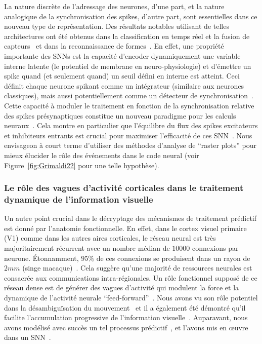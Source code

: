 La nature discrète de l'adressage des neurones, d'une part, et la nature
analogique de la synchronisation des spikes, d'autre part, sont
essentielles dans ce nouveau type de représentation. Des résultats
notables utilisant de telles architectures ont été obtenus dans la
classification en temps réel et la fusion de capteurs~\citep{Oconnor13} et dans la reconnaissance de formes~\citep{Lagorce17,Grimaldi21cbmi,Grimaldi22pami}. En
effet, une propriété importante des SNNs est la capacité d'encoder
dynamiquement une variable interne latente (le potentiel de membrane en
neuro-physiologie) et d'émettre un spike quand (et seulement quand) un
seuil défini en interne est atteint. Ceci définit chaque neurone spikant
comme un intégrateur (similaire aux neurones classiques), mais aussi
potentiellement comme un détecteur de synchronisation~\citep{Perrinet02}.
Cette capacité à moduler le traitement en fonction de la synchronisation
relative des spikes présynaptiques constitue un nouveau paradigme pour les
calculs neuraux~\citep{Paugam12}. Cela montre en
particulier que l'équilibre du flux des spikes excitateurs et inhibiteurs
entrants est crucial pour maximiser l'efficacité de ces SNN~\citep{Hansel12}. Nous envisageon à court terme d'utiliser des méthodes d'analyse de ``raster plots'' pour mieux élucider le rôle des événements dans le code neural (voir Figure~\ref{fig:Grimaldi22} pour une telle hypothèse).


\subsubsection{Le rôle des vagues d'activité corticales dans le traitement
dynamique de l'information
visuelle}
Un autre point crucial dans le décryptage des mécanismes de traitement
prédictif est donné par l'anatomie fonctionnelle. En effet, dans le
cortex visuel primaire (V1) comme dans les autres aires corticales, le
réseau neural est très majoritairement récurrent avec un nombre médian de $10000$
connexions par neurone. Étonnamment, $95 \%$ de ces connexions se
produisent dans un rayon de $2 mm$ (singe macaque)~\citep{Markov13}.
Cela suggère qu'une majorité de ressources neurales est consacrée aux
communications intra-régionales. Un rôle fonctionnel supposé de ce
réseau dense est de générer des vagues d'activité qui modulent la force
et la dynamique de l'activité neurale ``feed-forward''~\citep{Muller18}. Nous avons vu son rôle potentiel dans la désambiguïsation du
mouvement~\citep{Chemla19} et il a également été démontré qu'il
facilite l'accumulation progressive de l'information visuelle~\citep{Bringuier99}. Auparavant, nous avons modélisé avec succès un tel
processus prédictif~\citep{Perrinet12pred,Khoei13jpp,KhoeiMassonPerrinet17}, et l'avons mis en œuvre dans un SNN~\citep{Kaplan13}.

